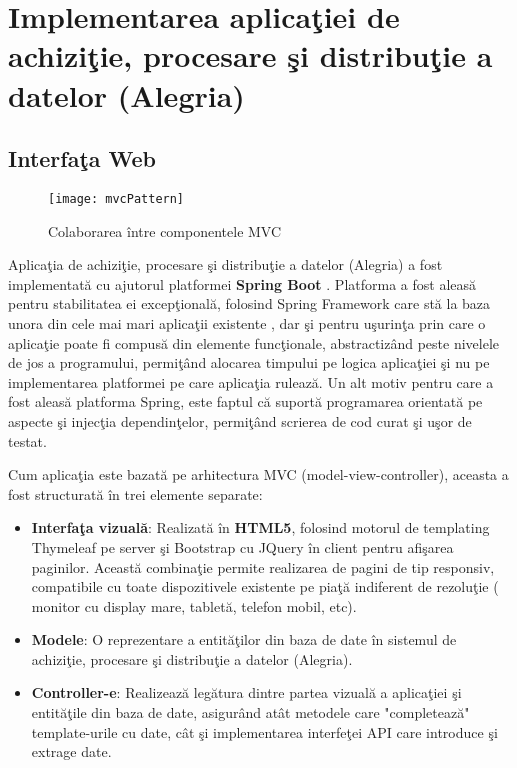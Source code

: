 \chapter{Implementarea aplicaţiei de achiziţie, procesare şi distribuţie a datelor (Alegria)}
\label{chapter:implemetare}
\section{Interfaţa Web}
\begin{wrapfigure}{r}{0.35\textwidth}
	\centering
	\captionsetup{justification=centering}
	\texttt{[image: mvcPattern]}
	\caption{Colaborarea între componentele MVC}
\end{wrapfigure}
Aplicaţia de achiziţie, procesare şi distribuţie a datelor (Alegria) a fost implementată cu ajutorul platformei \textbf{Spring Boot} \autocite{SpringBoot}. Platforma a fost aleasă pentru stabilitatea ei excepţională, folosind Spring Framework care stă la baza unora din cele mai mari aplicaţii existente \autocite{springUseCase}, dar şi pentru uşurinţa prin care o aplicaţie poate fi compusă din elemente funcţionale, abstractizând peste nivelele de jos a programului, permiţând alocarea timpului pe logica aplicaţiei şi nu pe implementarea platformei pe care aplicaţia rulează. Un alt motiv pentru care a fost aleasă platforma Spring, este faptul că suportă programarea orientată pe aspecte şi injecţia dependinţelor, permiţând scrierea de cod curat şi uşor de testat.

Cum aplicaţia este bazată pe arhitectura MVC (model-view-controller), aceasta a fost structurată în trei elemente separate: 
\begin{itemize}
\item  \textbf{Interfaţa vizuală}: Realizată în \textbf{HTML5}, folosind motorul de templating Thymeleaf pe server şi Bootstrap cu JQuery în client pentru afişarea paginilor. Această combinaţie permite realizarea de pagini de tip responsiv, compatibile cu toate dispozitivele existente pe piaţă indiferent de rezoluţie ( monitor cu display mare, tabletă, telefon mobil, etc).

\item  \textbf{Modele}: O reprezentare a entităţilor din baza de date în sistemul de achiziţie, procesare şi distribuţie a datelor (Alegria).

\item  \textbf{Controller-e}: Realizează legătura dintre partea vizuală a aplicaţiei şi entităţile din baza de date, asigurând atât metodele care "completează" template-urile cu date, cât şi implementarea interfeţei API care introduce şi extrage date.
\end{itemize}

